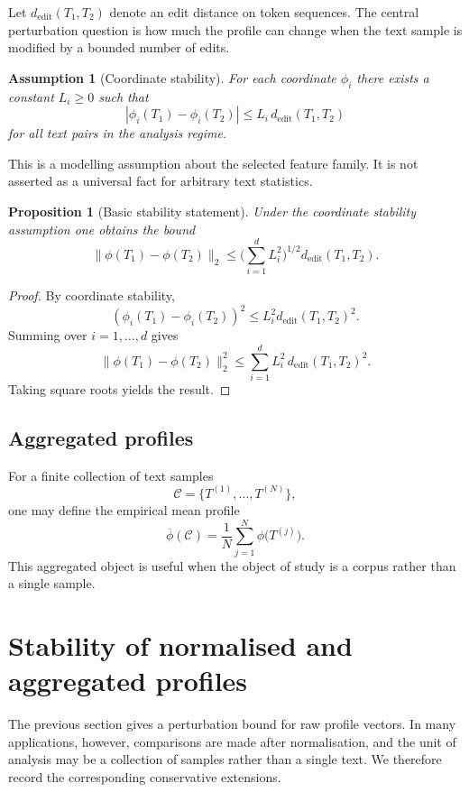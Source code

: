 \documentclass[11pt]{article}
\newtheorem{assumption}[definition]{Assumption}
\newtheorem{proposition}[definition]{Proposition}
\begin{document}
Let $d_{\mathrm{edit}}(T_1, T_2)$ denote an edit distance on token sequences. The central perturbation question is how much the profile can change when the text sample is modified by a bounded number of edits.

\begin{assumption}[Coordinate stability]
For each coordinate $\phi_i$ there exists a constant $L_i \geq 0$ such that
\[
|\phi_i(T_1) - \phi_i(T_2)| \leq L_i\, d_{\mathrm{edit}}(T_1, T_2)
\]
for all text pairs in the analysis regime.
\end{assumption}

This is a modelling assumption about the selected feature family. It is not asserted as a universal fact for arbitrary text statistics.

\begin{proposition}[Basic stability statement]
Under the coordinate stability assumption one obtains the bound
\[
\|\phi(T_1) - \phi(T_2)\|_2 \leq \Big(\sum_{i=1}^{d} L_i^2\Big)^{1/2} d_{\mathrm{edit}}(T_1, T_2).
\]
\end{proposition}

\begin{proof}
By coordinate stability,
\[
(\phi_i(T_1) - \phi_i(T_2))^2 \leq L_i^2 d_{\mathrm{edit}}(T_1, T_2)^2.
\]
Summing over $i = 1, \dots, d$ gives
\[
\|\phi(T_1) - \phi(T_2)\|_2^2 \leq \sum_{i=1}^{d} L_i^2\, d_{\mathrm{edit}}(T_1, T_2)^2.
\]
Taking square roots yields the result.
\end{proof}

\subsection{Aggregated profiles}

For a finite collection of text samples
\[
\mathcal{C} = \{T^{(1)}, \ldots, T^{(N)}\},
\]
one may define the empirical mean profile
\[
\overline{\phi}(\mathcal{C}) = \frac{1}{N} \sum_{j=1}^{N} \phi\big(T^{(j)}\big).
\]
This aggregated object is useful when the object of study is a corpus rather than a single sample.

\section{Stability of normalised and aggregated profiles}

The previous section gives a perturbation bound for raw profile vectors. In many applications, however, comparisons are made after normalisation, and the unit of analysis may be a collection of samples rather than a single text. We therefore record the corresponding conservative extensions.
\end{document}
